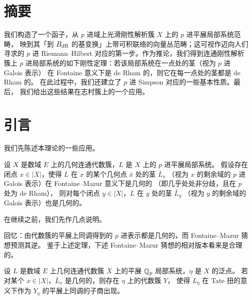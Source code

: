 
\section*{摘要}

我们构造了一个函子，从 $p$ 进域上光滑刚性解析簇 $X$ 上的 $p$ 进平展局部系统范畴，
映到其「到 $B_{\mathrm{dR}}$ 的基变换」上带可积联络的向量丛范畴；这可视作迈向人们寻求的
$p$ 进 Riemann--Hilbert 对应的第一步。作为推论，我们得到连通刚性解析簇上
$p$ 进局部系统的如下刚性定理：若该局部系统在一点处的茎（视为 $p$ 进 Galois 表示）
在 Fontaine 意义下是 de Rham 的，则它在每一点处的茎都是 de Rham 的。
在此过程中，我们还建立了 $p$ 进 Simpson 对应的一些基本性质。最后，
我们给出这些结果在志村簇上的一个应用。

\section{引言}\label{sec:intro}

我们先陈述本理论的一些应用。

\begin{thm}\label{thm:1.1}
设 $X$ 是数域 $E$ 上的几何连通代数簇，$L$ 是 $X$ 上的 $p$ 进平展局部系统。
假设存在闭点 $x\in|X|$，使得 $L$ 在 $x$ 的某个几何点 $\bar x$ 处的茎 $\bar L_x$
（视为 $x$ 的剩余域的 $p$ 进 Galois 表示）在 Fontaine--Mazur 意义下是几何的
（即几乎处处非分歧，且在 $p$ 处为 de Rham），
则对每个闭点 $y\in|X|$，$L$ 在 $y$ 处的茎 $\bar L_y$
（视为 $y$ 的剩余域的 Galois 表示）也是几何的。
\end{thm}

在继续之前，我们先作几点说明。

\begin{rmk}\label{rmk:1.1}
回忆：由代数簇的平展上同调得到的 $p$ 进表示都是几何的，而 Fontaine--Mazur 猜想预测其逆。
鉴于上述定理，下述 Fontaine--Mazur 猜想的相对版本看来是合理的。
\end{rmk}

\begin{conj*}
设 $L$ 是数域 $E$ 上几何连通代数簇 $X$ 上的平展 $\mathbb{Q}_p$ 局部系统，$\eta$ 是 $X$ 的泛点。
若对某个 $x\in|X|$，$\bar L_x$ 是几何的，则存在 $\eta$ 上的代数簇 $Y$，
使得 $L_{\bar\eta}$ 在 Tate 扭的意义下作为 $Y_{\bar\eta}$ 的平展上同调的子商出现。
\end{conj*}

